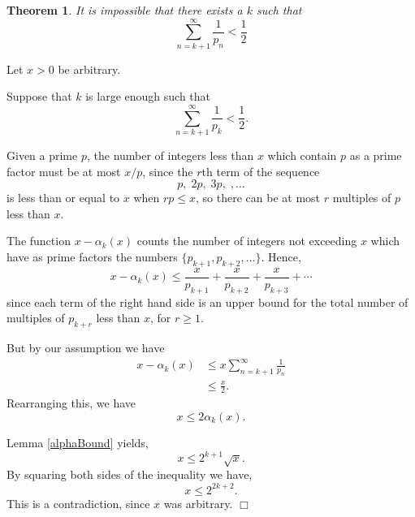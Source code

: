 \documentclass[10pt]{article}
\newtheorem{theorem}{Theorem}
\newenvironment{proof}[1][Proof]{\begin{trivlist}
\item[\hskip \labelsep {\bfseries #1}]}{\end{trivlist}}
\begin{document}
\begin{theorem}
    It is impossible that there exists a $k$
    such that
    \begin{equation*}
        \sum_{n=k+1}^\infty\frac{1}{p_n} < \frac{1}{2}
    \end{equation*}
\end{theorem}
\begin{proof}
    Let $x>0$ be arbitrary. 
    
    Suppose that $k$ is large enough such that
    \begin{equation*}
        \sum_{n=k+1}^\infty \frac{1}{p_k} <\frac{1}{2}.
    \end{equation*}
    
    Given a prime $p$, the number of integers less than $x$ which contain
    $p$ as a prime factor must be at most $x/p$, since the $r$th term of the sequence
    \begin{equation*}
        p,\;2p,\;3p,\;,\ldots
    \end{equation*}
    is less than or equal to $x$ when $rp \leq x$, so there can be at most $r$
    multiples of $p$ less than $x$.
    
    The function $x-\alpha_k(x)$
    counts the number of integers not exceeding $x$
    which have as prime factors the numbers $\{p_{k+1},p_{k+2},\ldots\}$.
    Hence,
    \begin{equation*}
        x-\alpha_k(x) \leq \frac{x}{p_{k+1}}+\frac{x}{p_{k+2}}+\frac{x}{p_{k+3}}+\cdots
    \end{equation*}
    since each term of the right hand side is an upper bound for the total
    number of multiples of $p_{k+r}$ less than $x$, for $r\geq 1$.
    
    But by our assumption we have
    \begin{align*}
        x-\alpha_k(x) &\leq x\sum_{n=k+1}^\infty\frac{1}{p_n}\\
        &\leq \frac{x}{2}.
    \end{align*}
    Rearranging this, we have
    \begin{equation*}
        x\leq 2\alpha_k(x).
    \end{equation*}
    
    Lemma \ref{alphaBound} yields,
    \begin{equation*}
        x\leq 2^{k+1}\sqrt{x}.
    \end{equation*}
    By squaring both sides of the inequality we have,
    \begin{equation*}
        x\leq 2^{2k+2}.
    \end{equation*}
    This is a contradiction, since $x$ was arbitrary. $\Box$    
\end{proof}
\end{document}
